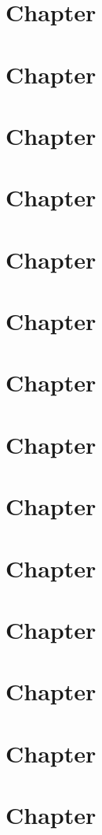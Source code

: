 \documentclass[a4paper,10pt]{book}
\begin{document}
\chapter{Chapter}\label{Chap15}
\chapter{Chapter}\label{Chap16}
\chapter{Chapter}\label{Chap17}
\chapter{Chapter}\label{Chap18}
\chapter{Chapter}\label{Chap19}
\chapter{Chapter}\label{Chap20}
\chapter{Chapter}\label{Chap21}
\chapter{Chapter}\label{Chap22}
\chapter{Chapter}\label{Chap23}
\chapter{Chapter}\label{Chap24}
\chapter{Chapter}\label{Chap25}
\chapter{Chapter}\label{Chap26}
\chapter{Chapter}\label{Chap27}
\chapter{Chapter}\label{Chap28}
\end{document}
